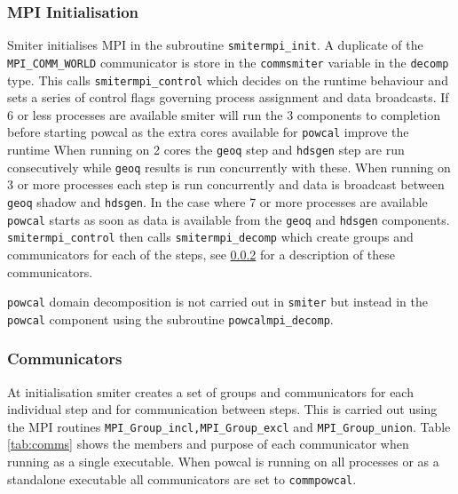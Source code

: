 \subsubsection{MPI Initialisation}
Smiter initialises MPI in the subroutine {\tt smitermpi\_init}. A duplicate of the {\tt MPI\_COMM\_WORLD} communicator is store in the {\tt commsmiter} variable in the {\tt decomp} type. This calls {\tt smitermpi\_control} which decides on the runtime behaviour and sets a series of control flags governing process assignment and data broadcasts. If 6 or less processes are available smiter will run the 3 components to completion before starting powcal as the extra cores available for {\tt powcal} improve the runtime When running on 2 cores the {\tt geoq} step and {\tt hdsgen} step are run consecutively while {\tt geoq} results is run concurrently with these. When running on 3 or more processes each step is run concurrently and data is broadcast between {\tt geoq} shadow and {\tt hdsgen}. In the case where 7 or more processes are available {\tt powcal} starts as soon as data is available from the {\tt geoq} and {\tt hdsgen} components. {\tt smitermpi\_control} then calls {\tt smitermpi\_decomp} which create groups and communicators for each of the steps, see \ref{loc:comms} for a description of these communicators.

{\tt powcal} domain decomposition is not carried out in {\tt smiter} but instead in the {\tt powcal} component using the subroutine {\tt powcalmpi\_decomp}.

\subsubsection{Communicators}
\label{loc:comms}
At initialisation smiter creates a set of groups and communicators for each individual step and for communication between steps. This is carried out using the MPI routines {\tt MPI\_Group\_incl,\tt MPI\_Group\_excl} and {\tt MPI\_Group\_union}. Table \ref{tab:comms} shows the members and purpose of each communicator when running as a single executable. When powcal is running on all processes or as a standalone executable all communicators are set to {\tt commpowcal}.

